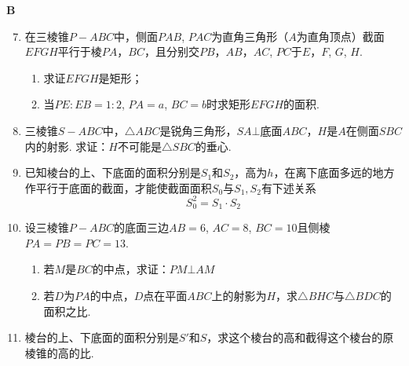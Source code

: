 \begin{center}
    \bfseries B
\end{center}
\begin{enumerate}\setcounter{enumi}{6}
\item 在三棱锥$P-ABC$中，侧面$PAB$, $PAC$为直角三角形（$A$为直角顶点）截面$EFGH$平行于棱$PA$，$BC$，且分别交$PB$，$AB$，$AC$, $PC$于$E$，$F$, $G$, $H$.
\begin{enumerate}[(1)]
    \item 求证$EFGH$是矩形；
    \item 当$PE:EB=1:2$, $PA=a$, $BC=b$时求矩形$EFGH$的面积.
\end{enumerate}

\item 三棱锥$S-ABC$中，$\triangle ABC$是锐角三角形，$SA\bot$底面$ABC$，$H$是$A$在侧面$SBC$内的射影. 求证：$H$不可能是$\triangle SBC$的垂心.


\noindent
\begin{minipage}{.45\textwidth}
\centering
{}
\end{minipage}
\hfill
\begin{minipage}{.45\textwidth}
\centering
{}
\end{minipage}



\item 已知棱台的上、下底面的面积分别是$S_1$和$S_2$，高为$h$，在离下底面多远的地方作平行于底面的截面，才能使截面面积$S_0$与$S_1, S_2$有下述关系
\[S^2_0=S_1\cdot S_2\]
\item 设三棱锥$P-ABC$的底面三边$AB=6$, $AC=8$, $BC=10$且侧棱$PA=PB=PC=13$.
\begin{enumerate}[(1)]
   \item 若$M$是$BC$的中点，求证：$PM\bot AM$
\item 若$D$为$PA$的中点，$D$点在平面$ABC$上的射影为$H$，求$\triangle BHC$与$\triangle BDC$的面积之比.
\end{enumerate}

\item 棱台的上、下底面的面积分别是$S'$和$S$，求这个棱台的高和截得这个棱台的原棱锥的高的比.
\end{enumerate}

